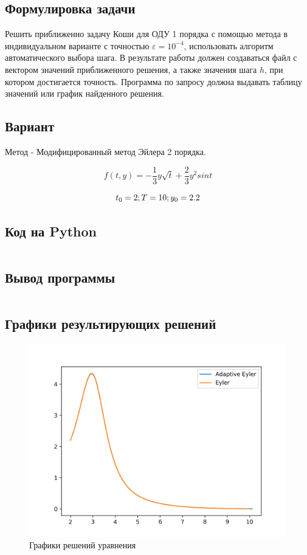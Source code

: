 \documentclass[a4paper,12pt]{article}
\newenvironment{longlisting}{\captionsetup{type=listing}}{}
\begin{document}
\subsection{Формулировка задачи}
Решить приближенно задачу Коши для ОДУ 1 порядка с помощью метода в индивидуальном варианте с точностью $\varepsilon = 10^{-4}$, использовать алгоритм автоматического выбора шага.
В результате работы должен создаваться файл с вектором значений приближенного решения, а также значения шага $h$, при котором достигается точность. Программа по запросу должна выдавать таблицу значений или график найденного решения.

\subsection{Вариант}
Метод - Модифицированный метод Эйлера 2 порядка.

$$ f(t, y) = -\frac{1}{3}y \sqrt{t} + \frac{2}{3}y^2 sin{t} $$
 
$$ t_0 = 2; \space T = 10; \space y_0 = 2.2 $$

\subsection{Код на Python}

\begin{longlisting}
	\inputminted{python}{src/adaptive_step.py}
\end{longlisting}

\subsection{Вывод программы}

\begin{longlisting}
	\inputminted{python}{output/adaptive_step.txt}
\end{longlisting}


\subsection{Графики результирующих решений}

\begin{figure}[H]
	\centering
	\includegraphics[width=\linewidth]{plots/adaptive_step.png}
	\caption{Графики решений уравнения}
	\label{fig:adams_rk}
\end{figure}
\end{document}
